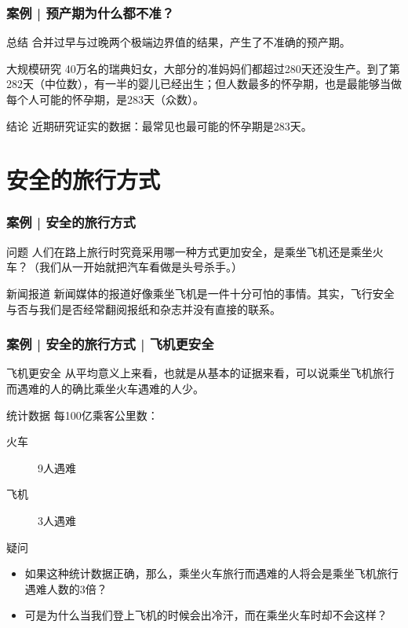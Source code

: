 \begin{frame}
  \frametitle{案例 | 预产期为什么都不准？}
  \begin{block}{总结}
    合并过早与过晚两个极端边界值的结果，产生了不准确的预产期。
  \end{block}
  \pause
  \begin{block}{大规模研究}
    40万名的瑞典妇女，大部分的准妈妈们都超过280天还没生产。到了第282天（中位数），有一半的婴儿已经出生；但人数最多的怀孕期，也是最能够当做每个人可能的怀孕期，是283天（众数）。
  \end{block}
  \pause
  \begin{block}{结论}
    近期研究证实的数据：最常见也最可能的怀孕期是283天。
  \end{block}
\end{frame}

\section{安全的旅行方式}
\begin{frame}
  \frametitle{案例 | 安全的旅行方式}
  \begin{block}{问题}
    人们在路上旅行时究竟采用哪一种方式更加安全，是乘坐飞机还是乘坐火车？（我们从一开始就把汽车看做是头号杀手。）
  \end{block}
  \pause
  \begin{block}{新闻报道}
    新闻媒体的报道好像乘坐飞机是一件十分可怕的事情。其实，飞行安全与否与我们是否经常翻阅报纸和杂志并没有直接的联系。
  \end{block}
\end{frame}

\begin{frame}
  \frametitle{案例 | 安全的旅行方式 | 飞机更安全}
  \begin{block}{飞机更安全}
    从平均意义上来看，也就是从基本的证据来看，可以说乘坐飞机旅行而遇难的人的确比乘坐火车遇难的人少。
  \end{block}
  \pause
  \begin{block}{统计数据}
    每100亿乘客公里数：
    \begin{description}
      \item[火车] 9人遇难
      \item[飞机] 3人遇难
    \end{description}
  \end{block}
  \pause
  \begin{block}{疑问}
    \begin{itemize}
      \item 如果这种统计数据正确，那么，乘坐火车旅行而遇难的人将会是乘坐飞机旅行遇难人数的3倍？
      \item 可是为什么当我们登上飞机的时候会出冷汗，而在乘坐火车时却不会这样？
    \end{itemize}
  \end{block}
\end{frame}


